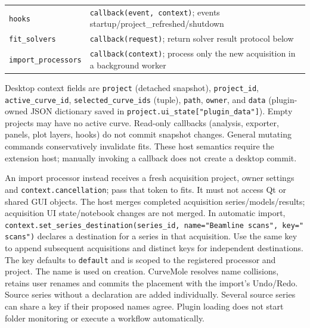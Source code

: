 \documentclass[
  10pt,
  a4paper,
  oneside]{scrreprt}
\begin{document}
\begin{longtable}[]{@{}ll@{}}
\begin{minipage}[t]{0.47\columnwidth}\raggedright
\texttt{hooks}\strut
\end{minipage} & \begin{minipage}[t]{0.47\columnwidth}\raggedright
\texttt{callback(event,\ context)}; events
startup/project\_refreshed/shutdown\strut
\end{minipage}\tabularnewline
\begin{minipage}[t]{0.47\columnwidth}\raggedright
\texttt{fit\_solvers}\strut
\end{minipage} & \begin{minipage}[t]{0.47\columnwidth}\raggedright
\texttt{callback(request)}; return solver result protocol below\strut
\end{minipage}\tabularnewline
\begin{minipage}[t]{0.47\columnwidth}\raggedright
\texttt{import\_processors}\strut
\end{minipage} & \begin{minipage}[t]{0.47\columnwidth}\raggedright
\texttt{callback(context)}; process only the new acquisition in a
background worker\strut
\end{minipage}\tabularnewline
\bottomrule
\end{longtable}

Desktop context fields are \texttt{project} (detached snapshot),
\texttt{project\_id}, \texttt{active\_curve\_id},
\texttt{selected\_curve\_ids} (tuple), \texttt{path}, \texttt{owner},
and \texttt{data} (plugin-owned JSON dictionary saved in
\texttt{project.ui\_state{[}"plugin\_data"{]}}). Empty projects may have
no active curve. Read-only callbacks (analysis, exporter, panels, plot
layers, hooks) do not commit snapshot changes. General mutating commands
conservatively invalidate fits. These host semantics require the
extension host; manually invoking a callback does not create a desktop
commit.

An import processor instead receives a fresh acquisition project, owner
settings and \texttt{context.cancellation}; pass that token to fits. It
must not access Qt or shared GUI objects. The host merges completed
acquisition series/models/results; acquisition UI state/notebook changes
are not merged. In automatic import,
\texttt{context.set\_series\_destination(series\_id,\ name="Beamline\ scans",\ key="scans")}
declares a destination for a series in that acquisition. Use the same
key to append subsequent acquisitions and distinct keys for independent
destinations. The key defaults to \texttt{default} and is scoped to the
registered processor and project. The name is used on creation.
CurveMole resolves name collisions, retains user renames and commits the
placement with the import's Undo/Redo. Source series without a
declaration are added individually. Several source series can share a
key if their proposed names agree. Plugin loading does not start folder
monitoring or execute a workflow automatically.
\end{document}

